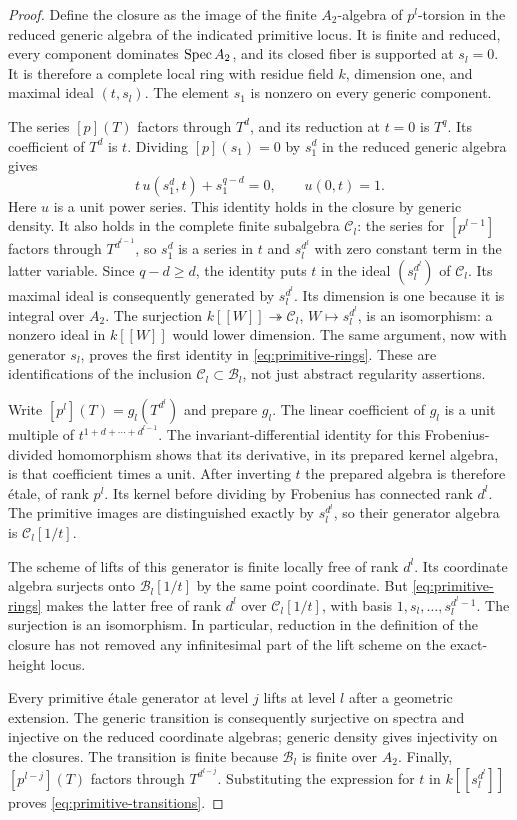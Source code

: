 \begin{proof}
Define the closure as the image of the finite $A_2$-algebra of $p^l$-torsion
in the reduced generic algebra of the indicated primitive locus.  It is
finite and reduced, every component dominates $\operatorname{Spec} A_2$, and its
closed fiber is supported at $s_l=0$.  It is therefore a complete local
ring with residue field $k$, dimension one, and maximal ideal $(t,s_l)$.
The element $s_1$ is nonzero on every generic component.

The series $[p](T)$ factors through $T^d$, and its reduction at $t=0$
is $T^q$.  Its coefficient of $T^d$ is $t$.  Dividing $[p](s_1)=0$
by $s_1^d$ in the reduced generic algebra gives
\[
 t\,u(s_1^d,t)+s_1^{q-d}=0,
 \qquad u(0,t)=1.
\]
Here $u$ is a unit power series.  This identity holds in the closure by
generic density.  It also holds in the complete finite subalgebra
$\mathcal C_l$: the series for $[p^{l-1}]$ factors through
$T^{d^{l-1}}$, so $s_1^d$ is a series in $t$ and $s_l^{d^l}$ with
zero constant term in the latter variable.  Since $q-d\geq d$, the
identity puts $t$ in the ideal $(s_l^{d^l})$ of $\mathcal C_l$.
Its maximal ideal is consequently generated by $s_l^{d^l}$.
Its dimension is one because it is integral over $A_2$.
The surjection
$k[[W]]\twoheadrightarrow\mathcal C_l$, $W\mapsto s_l^{d^l}$,
is an isomorphism: a nonzero ideal in $k[[W]]$ would lower dimension.
The same argument, now with generator $s_l$, proves the first identity
in \eqref{eq:primitive-rings}.  These are identifications of the
inclusion $\mathcal C_l\subset\mathcal B_l$, not just abstract
regularity assertions.

Write $[p^l](T)=g_l(T^{d^l})$ and prepare $g_l$.
The linear coefficient of $g_l$ is a unit multiple of
$t^{1+d+\cdots+d^{l-1}}$.  The invariant-differential identity for this
Frobenius-divided homomorphism shows that its derivative, in its prepared
kernel algebra, is that coefficient times a unit.  After inverting $t$
the prepared algebra is therefore étale, of rank $p^l$.
Its kernel before dividing by Frobenius has connected rank $d^l$.
The primitive images are distinguished exactly by $s_l^{d^l}$, so
their generator algebra is $\mathcal C_l[1/t]$.

The scheme of lifts of this generator is finite locally free of rank
$d^l$.  Its coordinate algebra surjects onto
$\mathcal B_l[1/t]$ by the same point coordinate.  But
\eqref{eq:primitive-rings} makes the latter free of rank $d^l$ over
$\mathcal C_l[1/t]$, with basis $1,s_l,\ldots,s_l^{d^l-1}$.
The surjection is an isomorphism.  In particular, reduction in the
definition of the closure has not removed any infinitesimal part of the
lift scheme on the exact-height locus.

Every primitive étale generator at level $j$ lifts at level $l$ after
a geometric extension.  The generic transition is consequently
surjective on spectra and injective on the reduced coordinate algebras;
generic density gives injectivity on the closures.  The transition is
finite because $\mathcal B_l$ is finite over $A_2$.  Finally,
$[p^{l-j}](T)$ factors through $T^{d^{l-j}}$.  Substituting the expression
for $t$ in $k[[s_l^{d^l}]]$ proves
\eqref{eq:primitive-transitions}.
\end{proof}

